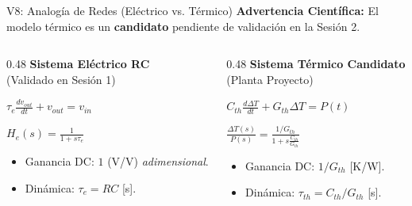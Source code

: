 \documentclass[aspectratio=169, xcolor={table,xcdraw}]{beamer}
\begin{document}
\begin{frame}{V8: Analogía de Redes (Eléctrico vs. Térmico)}
    \textbf{Advertencia Científica:} El modelo térmico es un \textbf{candidato} pendiente de validación en la Sesión 2.
    
    \vspace{0.2cm}
    \begin{columns}[T]
        \begin{column}{0.48\textwidth}
            \centering
            \textbf{Sistema Eléctrico RC} \\
            (Validado en Sesión 1)
            
            \vspace{0.2cm}
            {\centering $\displaystyle \tau_e \frac{dv_{out}}{dt} + v_{out} = v_{in}$ \par}
            \vspace{0.2cm}
            {\centering $\displaystyle H_e(s) = \frac{1}{1 + s\tau_e}$ \par}
            \vspace{0.2cm}
            
            \begin{itemize}
                \item Ganancia DC: $1$ (V/V) \textit{adimensional}.
                \item Dinámica: $\tau_e = RC$ [s].
            \end{itemize}
        \end{column}
        \begin{column}{0.48\textwidth}
            \centering
            \textbf{Sistema Térmico Candidato} \\
            (Planta Proyecto)
            
            \vspace{0.2cm}
            {\centering $\displaystyle C_{th} \frac{d\Delta T}{dt} + G_{th}\Delta T = P(t)$ \par}
            \vspace{0.2cm}
            {\centering $\displaystyle \frac{\Delta T(s)}{P(s)} = \frac{1/G_{th}}{1 + s \frac{C_{th}}{G_{th}}}$ \par}
            \vspace{0.2cm}
            
            \begin{itemize}
                \item Ganancia DC: $1/G_{th}$ [K/W].
                \item Dinámica: $\tau_{th} = C_{th}/G_{th}$ [s].
            \end{itemize}
        \end{column}
    \end{columns}
\end{frame}
\end{document}

